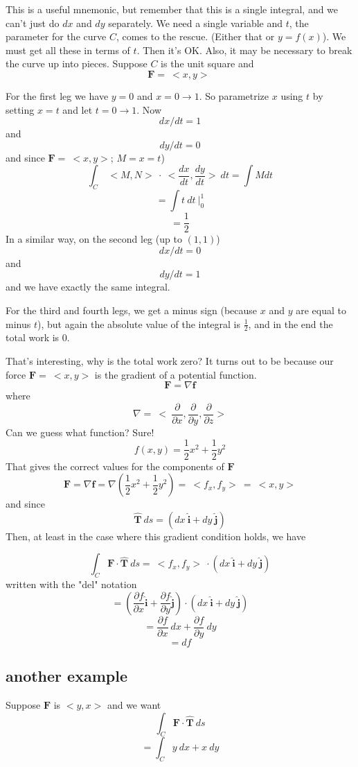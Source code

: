 \documentclass[11pt, oneside]{article}   	%
\begin{document}
This is a useful mnemonic, but remember that this is a single integral, and we can't just do $dx$ and $dy$ separately.  We need a single variable and $t$, the parameter for the curve $C$, comes to the rescue.  (Either that or $y=f(x)$).  We must get all these in terms of $t$.  Then it's OK.  Also, it may be necessary to break the curve up into pieces.
Suppose $C$ is the unit square and 
\[ \mathbf{F} = \ <x,y> \ \]

For the first leg we have $y=0$ and $x=0 \rightarrow 1$.  So parametrize $x$ using $t$ by setting $x=t$ and let $t=0 \rightarrow 1$.  Now
\[ dx/dt = 1 \] 
and 
\[ dy/dt=0 \]
 and since $\mathbf{F} = \ <x,y>$;  $M = x = t$)
 \[   \int_C  \ <M,N> \ \cdot \ <\frac{dx}{dt},\frac{dy}{dt}> \ dt = \int M dt \]
\[ = \int t \ dt \ \bigg|_0^1 \]
\[ = \frac{1}{2} \]
In a similar way, on the second leg (up to $(1,1)$)
\[ dx/dt=0 \]
 and 
 \[ dy/dt=1 \]
 and we have exactly the same integral.

For the third and fourth legs, we get a minus sign (because $x$ and $y$ are equal to minus $t$), but again the absolute value of the integral is $\frac{1}{2}$, and in the end the total work is 0.

That's interesting, why is the total work zero?  It turns out to be because our force $\mathbf{F} = \ <x,y>$ is the gradient of a potential function.  
\[ \mathbf{F} = \nabla \mathbf{f} \]
where
\[ \nabla = \ < \ \frac{\partial }{\partial  x},\frac{\partial }{\partial  y},\frac{\partial }{\partial  z} > \]
Can we guess what function? Sure!
\[ f(x,y) = \frac{1}{2}x^2 + \frac{1}{2}y^2 \]
That gives the correct values for the components of $\mathbf{F}$
\[ \mathbf{F} = \nabla \mathbf{f} = \nabla ( \frac{1}{2}x^2 + \frac{1}{2}y^2) = \ <f_x,f_y> \ = \ <x,y> \]
and since 
\[  \hat{\mathbf{T}} \ ds = (dx\ \hat{\mathbf{i}} + dy\ \hat{\mathbf{j}}) \]
Then, at least in the case where this gradient condition holds, we have

\[ \int_C \mathbf{F} \cdot  \hat{\mathbf{T}} \ ds  = \ <f_x,f_y> \  \cdot  (dx\ \hat{\mathbf{i}} + dy\ \hat{\mathbf{j}})  \] 
written with the "del" notation
\[= (\frac{\partial f}{\partial  x} \hat{\mathbf{i}} + \frac{\partial f}{\partial  y} \hat{\mathbf{j}}) \cdot (dx\ \hat{\mathbf{i}} + dy\ \hat{\mathbf{j}}) \]
\[ = \frac{\partial f}{\partial  x} \ dx + \frac{\partial f}{\partial  y} \ dy \]
\[ = df \]

\subsection*{another example}
Suppose $\mathbf{F}$ is $<y,x> $ and we want
\[ \int_C \mathbf{F} \cdot  \hat{\mathbf{T}} \ ds \]
\[ = \int_C y \ dx + x \ dy \]
\end{document}
